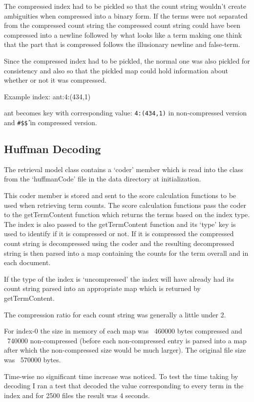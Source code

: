 \documentclass[letterpaper,11pt,twoside]{article}
\begin{document}
The compressed index had to be pickled so that the count string wouldn't create ambiguities when compressed into a binary form. If the terms were not separated from the compressed count string the compressed count string could have been compressed into a newline followed by what looks like a term making one think that the part that is compressed follows the illusionary newline and false-term.

Since the compressed index had to be pickled, the normal one was also pickled for consistency and also so that the pickled map could hold information about whether or not it was compressed.

Example index:
ant:4:(434,1)

ant becomes key with corresponding value: \texttt{4:(434,1)} in non-compressed version and \texttt{\#\$\^\$} in compressed version.

\subsection{Huffman Decoding}
The retrieval model class contains a `coder' member which is read into the class from the `huffmanCode' file in the data directory at initialization.

This coder member is stored and sent to the score calculation functions to be used when retrieving term counts. The score calculation functions pass the coder to the getTermContent function which returns the terms based on the index type. The index is also passed to the getTermContent function and its `type' key is used to identify if it is compressed or not. If it is compressed the compressed count string is decompressed using the coder and the resulting decompressed string is then parsed into a map containing the counts for the term overall and in each document.

If the type of the index is `uncompressed' the index will have already had its count string parsed into an appropriate map which is returned by getTermContent.

The compression ratio for each count string was generally a little under 2.

For index-0 the size in memory of each map was ~460000 bytes compressed and ~740000 non-compressed (before each non-compressed entry is parsed into a map after which the non-compressed size would be much larger). The original file size was ~570000 bytes.

Time-wise no significant time increase was noticed. To test the time taking by decoding I ran a test that decoded the value corresponding to every term in the index and for 2500 files the result was 4 seconds.
\end{document}
